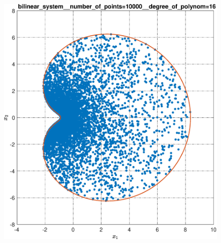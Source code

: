 \documentclass[../main.tex]{subfiles}
\begin{document}
\begin{figure}[ht!]
\begin{minipage}[b]{.3\linewidth}
  	\end{minipage}
  	\hfill
  	\begin{minipage}[b]{.3\linewidth} 
  		\small
  		\centering
  		\includegraphics[width=\linewidth]{images/bilinear_system__number_of_points=10000__degree_of_polynom=16.eps}
  	\end{minipage} 
  		\vfill
  	\hspace{-2.5ex}
  	\begin{minipage}[b]{.3\linewidth} 
  		\small
  		\centering 

\end{minipage}
\end{figure}
\end{document}
